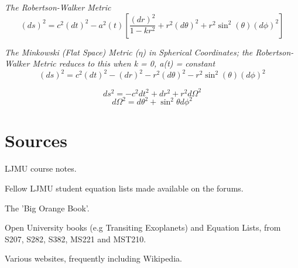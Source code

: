 \documentclass{article}
\begin{document}
\textit {The Robertson-Walker Metric}
\begin{equation}
(ds)^2 = c^2 (dt)^2 - a^2(t) \left[ \frac {(dr)^2}{1-kr^2} + r^2(d\theta)^2 +r^2 \sin^2(\theta) (d\phi)^2 \right]
\end{equation}

\textit {The Minkowski (Flat Space) Metric (\(\eta\)) in Spherical Coordinates; the Robertson-Walker Metric reduces to this when k = 0, a(t) = constant}
\begin{equation}
(ds)^2 = c^2 (dt)^2 - (dr)^2 - r^2(d\theta)^2  - r^2 \sin^2(\theta) (d\phi)^2
\end{equation}
\begin{center}
\end{center}
\begin{equation}
ds^2 = - c^2 dt^2 + dr^2 +r^2 d\Omega^2
\end{equation}
\begin{equation}
d\Omega^2 = d\theta^2 + \sin^2\theta d\phi^2 
\end{equation}

\newpage

\section {Sources}
LJMU course notes.

Fellow LJMU student equation lists made available on the forums. 

The 'Big Orange Book'.

Open University books (e.g Transiting Exoplanets) and Equation Lists, from S207, S282, S382, MS221 and MST210.

Various websites, frequently including Wikipedia.


\end{document}
